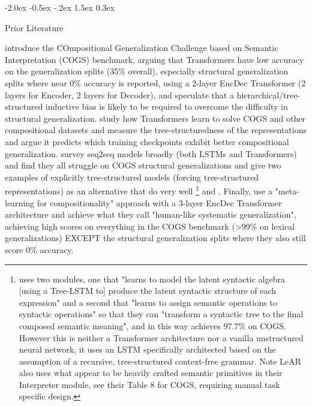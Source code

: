 \documentclass[11pt]{article}
\makeatletter
\renewcommand\section{\@startsection{section}{1}{\z@}%
                                  {-2.0ex \@plus -0.5ex \@minus -.2ex}%
                                  {1.5ex \@plus 0.3ex}%
                                  {\large\bfseries\raggedright}}
\makeatother
\begin{document}
\section{Prior Literature}

\citep{KimLinzen2020} introduce the COmpositional Generalization Challenge based on Semantic Interpretation (COGS) benchmark, arguing that Transformers have low accuracy on the generalization splits (35\% overall), especially structural generalization splits where near 0\% accuracy is reported, using a 2-layer EncDec Transformer (2 layers for Encoder, 2 layers for Decoder), and speculate that a hierarchical/tree-structured inductive bias is likely to be required to overcome the difficulty in structural generalization. \citep{murty2022characterizingintrinsiccompositionalitytransformers} study how Transformers learn to solve COGS and other compositional datasets and measure the tree-structuredness of the representations and argue it predicts which training checkpoints exhibit better compositional generalization. \citep{yao-koller-2022-structural} survey seq2seq models broadly (both LSTMs and Transformers) and find they all struggle on COGS structural generalizations and give two examples of explicitly tree-structured models (forcing tree-structured representations) as an alternative that do very well \citep{liu-etal-2021-learning-algebraic}\footnote{\citep{liu-etal-2021-learning-algebraic} uses two modules, one that "learns to model the latent syntactic algebra [using a Tree-LSTM to] produce the latent syntactic structure of each expression" and a second that "learns to assign semantic operations to syntactic operations" so that they can "transform a syntactic tree to the final composed semantic meaning", and in this way achieves 97.7\% on COGS. However this is neither a Transformer architecture nor a vanilla unstructured neural network, it uses an LSTM specifically architected based on the assumption of a recursive, tree-structured context-free grammar. Note LeAR also uses what appear to be heavily crafted semantic primitives in their Interpreter module, see their Table 8 for COGS, requiring manual task specific design.} and \citep{weissenhorn-etal-2022-compositional}. Finally, \citep{lake2023human} use a "meta-learning for compositionality" approach with a 3-layer EncDec Transformer architecture and achieve what they call "human-like systematic generalization", achieving high scores on everything in the COGS benchmark (>99\% on lexical generalizations) EXCEPT the structural generalization splits where they also still score 0\% accuracy.
\end{document}
